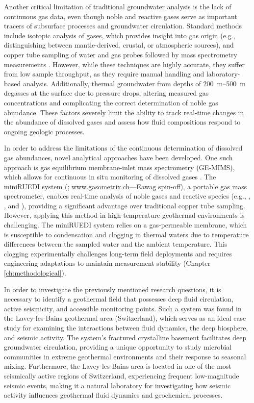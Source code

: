 Another critical limitation of traditional groundwater analysis is the lack of continuous gas data, even though noble and reactive gases serve as important tracers of subsurface processes and groundwater circulation.
Standard methods include isotopic analysis of gases, which provides insight into gas origin (e.g., distinguishing between mantle-derived, crustal, or atmospheric sources), and copper tube sampling of water and gas probes followed by mass spectrometry measurements \citep{beyerle2000mass}.
However, while these techniques are highly accurate, they suffer from low sample throughput, as they require manual handling and laboratory-based analysis.
Additionally, thermal groundwater from depths of \SIrange{200}{500}{\metre} degasses at the surface due to pressure drops, altering measured gas concentrations and complicating the correct determination of noble gas abundance.
These factors severely limit the ability to track real-time changes in the abundance of dissolved gases and assess how fluid compositions respond to ongoing geologic processes.

In order to address the limitations of the continuous determination of dissolved gas abundances, novel analytical approaches have been developed.
One such approach is gas equilibrium membrane-inlet mass spectrometry (GE-MIMS), which allows for continuous in situ monitoring of dissolved gases \citep{maechler2012miniruedi}.
The miniRUEDI system (\cite{brennwald2016portable}; \url{www.gasometrix.ch}---Eawag spin-off), a portable gas mass spectrometer, enables real-time analysis of noble gases and reactive species (e.g., , , and ), providing a significant advantage over traditional copper tube sampling.
However, applying this method in high-temperature geothermal environments is challenging.
The miniRUEDI system relies on a gas-permeable membrane, which is susceptible to condensation and clogging in thermal waters due to temperature differences between the sampled water and the ambient temperature. 
This clogging experimentally challenges long-term field deployments and requires engineering adaptations to maintain measurement stability (Chapter \ref{ch:methodological}).

In order to investigate the previously mentioned research questions, it is necessary to identify a geothermal field that possesses deep fluid circulation, active seismicity, and accessible monitoring points.
Such a system was found in the Lavey-les-Bains geothermal area (Switzerland), which serves as an ideal case study for examining the interactions between fluid dynamics, the deep biosphere, and seismic activity.
The system's fractured crystalline basement facilitates deep groundwater circulation, providing a unique opportunity to study microbial communities in extreme geothermal environments and their response to seasonal mixing.
Furthermore, the Lavey-les-Bains area is located in one of the most seismically active regions of Switzerland, experiencing frequent low-magnitude seismic events, making it a natural laboratory for investigating how seismic activity influences geothermal fluid dynamics and geochemical processes.


